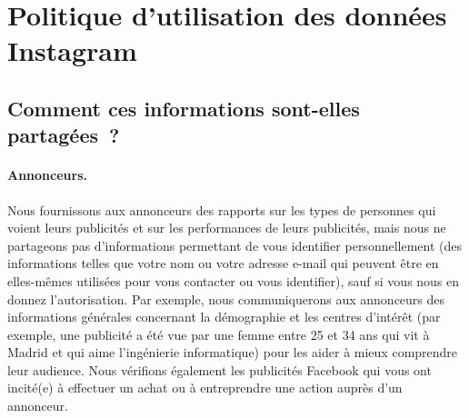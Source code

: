 \section{Politique d'utilisation des données Instagram}

\subsection{Comment ces informations sont-elles partagées ?}
\paragraph{Annonceurs.}

Nous fournissons aux annonceurs des rapports sur les types de personnes qui voient leurs publicités et sur les performances de leurs publicités, mais nous ne partageons pas d'informations permettant de vous identifier personnellement (des informations telles que votre nom ou votre adresse e-mail qui peuvent être en elles-mêmes utilisées pour vous contacter ou vous identifier), sauf si vous nous en donnez l'autorisation. Par exemple, nous communiquerons aux annonceurs des informations générales concernant la démographie et les centres d'intérêt (par exemple, une publicité a été vue par une femme entre 25 et 34 ans qui vit à Madrid et qui aime l'ingénierie informatique) pour les aider à mieux comprendre leur audience. Nous vérifions également les publicités Facebook qui vous ont incité(e) à effectuer un achat ou à entreprendre une action auprès d'un annonceur.
